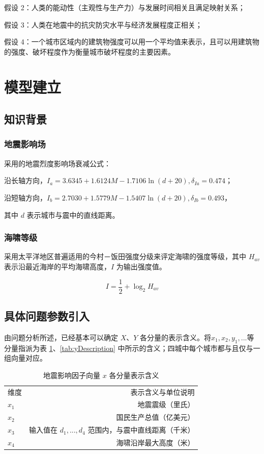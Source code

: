 \documentclass[UTF8]{ctexart}
\begin{document}
假设 2：人类的能动性（主观性与生产力）与发展时间相关且满足映射关系；

假设 3：人类在地震中的抗灾防灾水平与经济发展程度正相关；

假设 4：一个城市区域内的建筑物强度可以用一个平均值来表示，且可以用建筑物的强度、破坏程度作为衡量城市破坏程度的主要因素。

\section{模型建立}
\subsection{知识背景}
\subsubsection{地震影响场}
采用的地震烈度影响场衰减公式：

沿长轴方向，$I_a = 3.6345 + 1.6124M - 1.7106\ln(d + 20), \delta_{Ia} = 0.474$；

沿短轴方向，$I_b = 2.7030 + 1.5779M - 1.5407\ln(d + 20), \delta_{Ib} = 0.493$，

其中 $d$ 表示城市与震中的直线距离。\cite{傅再扬2007福建地震灾害损失计算分析与思考}

\subsubsection{海啸等级}
采用太平洋地区普遍适用的今村－饭田强度分级来评定海啸的强度等级，其中 $H_{av}$ 表示沿最近海岸的平均海啸高度，$I$ 为输出强度值。\cite{papadopoulos2001proposal}

$$I = \frac{1}{2} + \log_{2}H_{av}$$

\subsection{具体问题参数引入}
由问题分析所述，已经基本可以确定 $X$、$Y$ 各分量的表示含义。将$x_1, x_2, y_1, ...$等分量指派为表 \ref{tab:xDescription}、\ref{tab:yDescription} 中所示的含义；四城中每个城市都与且仅与一组向量对应。
\begin{table}[htbp]
  \caption{地震影响因子向量 $x$ 各分量表示含义}
  \label{tab:xDescription}
  \centering
  \begin{tabular}{lr}
    维度 & 表示含义与单位说明 \\
    $x_1$ & 地震震级（里氏） \\
    $x_2$ & 国民生产总值（亿美元）\\
    $x_3$ & 输入值在 $d_1, ..., d_4$ 范围内，与震中直线距离（千米）\\
    $x_4$ & 海啸沿岸最大高度（米）
  \end{tabular}
\end{table}
\end{document}
